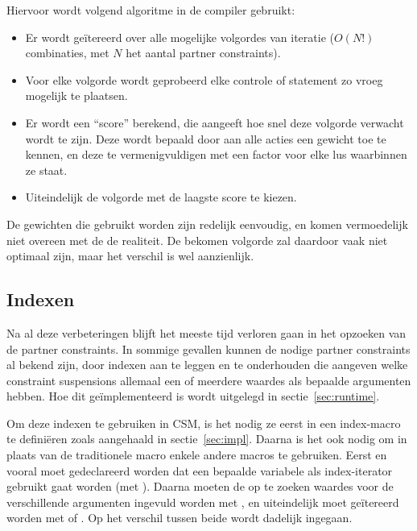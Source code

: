 Hiervoor wordt volgend algoritme in de compiler gebruikt: \begin{itemize}
  \item Er wordt ge\"itereerd over alle mogelijke volgordes van iteratie ($O(N!)$ combinaties, met $N$ het aantal partner constraints).
  \item Voor elke volgorde wordt geprobeerd elke controle of statement zo vroeg mogelijk te plaatsen.
  \item Er wordt een ``score'' berekend, die aangeeft hoe snel deze volgorde verwacht wordt te zijn. Deze wordt bepaald door aan alle acties een gewicht toe te kennen, en deze te vermenigvuldigen met een factor voor elke lus waarbinnen ze staat.
  \item Uiteindelijk de volgorde met de laagste score te kiezen.
\end{itemize}
De gewichten die gebruikt worden zijn redelijk eenvoudig, en komen vermoedelijk niet overeen met de de realiteit. De bekomen volgorde zal daardoor vaak niet optimaal zijn, maar het verschil is wel aanzienlijk.

\subsection{Indexen} \label{gencode-index}


Na al deze verbeteringen blijft het meeste tijd verloren gaan in het opzoeken van de partner constraints. In sommige gevallen kunnen de nodige partner constraints al bekend zijn, door indexen aan te leggen en te onderhouden die aangeven welke constraint suspensions allemaal een of meerdere waardes als bepaalde argumenten hebben. Hoe dit ge\"implementeerd is wordt uitgelegd in sectie~\ref{sec:runtime}.

Om deze indexen te gebruiken in CSM, is het nodig ze eerst in een index-macro te defini\"eren zoals aangehaald in sectie~\ref{sec:impl}. Daarna is het ook nodig om in plaats van de traditionele  macro enkele andere macros te gebruiken. Eerst en vooral moet gedeclareerd worden dat een bepaalde variabele als index-iterator gebruikt gaat worden (met ). Daarna moeten de op te zoeken waardes voor de verschillende argumenten ingevuld worden met , en uiteindelijk moet ge\"itereerd worden met  of . Op het verschil tussen beide wordt dadelijk ingegaan.

